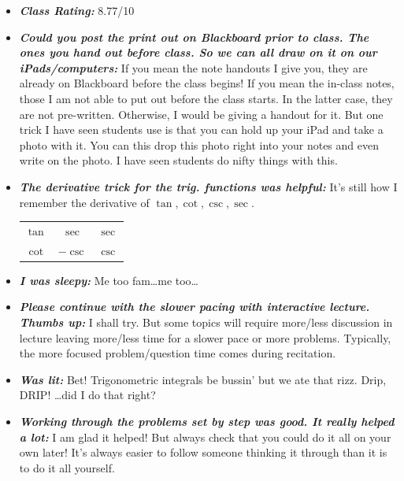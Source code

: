 \documentclass[11pt,letterpaper]{article}
\begin{document}
\begin{itemize}
\item {\bfseries\itshape Class Rating:} 8.77/10

\item {\bfseries\itshape Could you post the print out on Blackboard prior to class. The ones you hand out before class. So we can all draw on it on our iPads/computers:} If you mean the note handouts I give you, they are already on Blackboard before the class begins! If you mean the in-class notes, those I am not able to put out before the class starts. In the latter case, they are not pre-written. Otherwise, I would be giving a handout for it. But one trick I have seen students use is that you can hold up your iPad and take a photo with it. You can this drop this photo right into your notes and even write on the photo. I have seen students do nifty things with this. 

\item {\bfseries\itshape The derivative trick for the trig. functions was helpful:} It's still how I remember the derivative of $\tan, \cot, \csc, \sec$. 
	\begin{table}[H]
	\centering
	\begin{tabular}{ccc}
	$\tan$ & $\sec$ & $\sec$ \\
	$\cot$ & $-\csc$ & $\csc$
	\end{tabular}
	\end{table}

\item {\bfseries\itshape I was sleepy:} Me too fam\dots me too\dots

\item {\bfseries\itshape Please continue with the slower pacing with interactive lecture. Thumbs up:} I shall try. But some topics will require more/less discussion in lecture leaving more/less time for a slower pace or more problems. Typically, the more focused problem/question time comes during recitation. 

\item {\bfseries\itshape Was lit:} Bet! Trigonometric integrals be bussin' but we ate that rizz. Drip, DRIP! \dots did I do that right? 

\item {\bfseries\itshape Working through the problems set by step was good. It really helped a lot:} I am glad it helped! But always check that you could do it all on your own later! It's always easier to follow someone thinking it through than it is to do it all yourself. 


\end{itemize}
\end{document}
